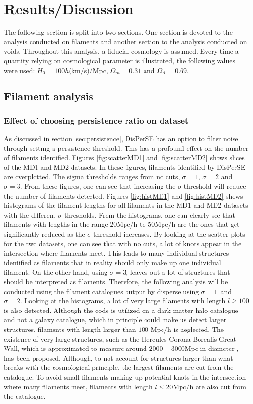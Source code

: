 \chapter{Results/Discussion}\label{sec:results}
The following section is split into two sections. One section is devoted to the analysis conducted on filaments and another section to the analysis conducted on voids. Throughout this analysis, a fiducial cosmology is assumed. Every time a quantity relying on cosmological parameter is illustrated, the following values were used: $H_0=100h$(km/s)/Mpc, $\Omega_m=0.31$ and $\Omega_\Lambda=0.69$. 
\section{Filament analysis}\label{sec:filaments}

\subsection{Effect of choosing persistence ratio on dataset}
As discussed in section \ref{sec:persistence}, DisPerSE has an option to filter
noise through setting a persistence threshold. This has a profound effect on the number of filaments identified. Figures \ref{fig:scatterMD1} and \ref{fig:scatterMD2} shows slices of the MD1 and MD2 datasets. In these figures, filaments identified by DisPerSE are overplotted. The sigma thresholds ranges from no cuts, $\sigma=1$, $\sigma=2$ and $\sigma=3$. From these figures, one can see that increasing the $\sigma$ threshold will reduce the number of filaments detected. Figures \ref{fig:histMD1} and \ref{fig:histMD2} shows histograms of the filament lengths for all filaments in the MD1 and MD2 datasets with the different $\sigma$ thresholds. From the histograms, one can clearly see that filaments with lengths in the range $20$Mpc/h to $50$Mpc/h are the ones that get significantly reduced as the $\sigma$ threshold increases. By looking at the scatter plots for the two datasets, one can see that with no cuts, a lot of knots appear in the intersection where filaments meet. This leads to many individual structures identified as filaments that in reality should only make up one individual filament. On the other hand, using $\sigma=3$, leaves out a lot of structures that should be interpreted as filaments. Therefore, the following analysis will be conducted using the filament catalogues output by disperse using $\sigma=1$ and $\sigma=2$. Looking at the histograms, a lot of very large filaments with length $l\geq 100$ is also detected. Although the code is utilized on a dark matter halo catalogue and not a galaxy catalogue, which in principle could make us detect larger structures, filaments with length larger than $100$ Mpc/h is neglected. The existence of very large structures, such as the Hercules-Corona Borealis Great Wall, which is approximated to measure around $2000-3000$Mpc in diameter \cite{herculescorona}, has been proposed. Although, to not account for structures larger than what breaks with the cosmological principle, the largest filaments are cut from the catalogue. To avoid small filaments making up potential knots in the intersection where many filaments meet, filaments with length $l\leq 20$Mpc/h are also cut from the catalogue.
